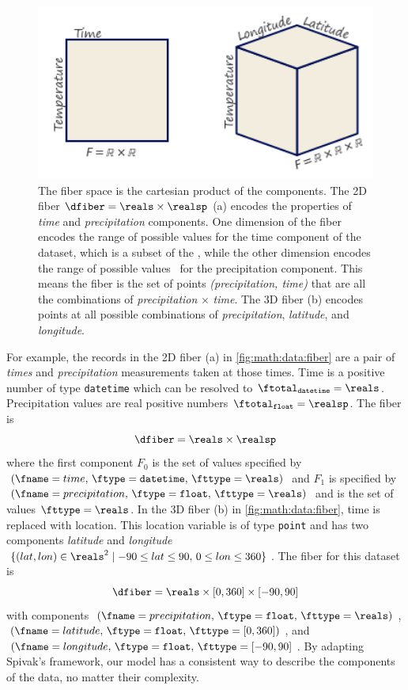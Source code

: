 \documentclass[../main.tex]{subfiles}
\begin{document}
\begin{figure}[H]
    \includegraphics[width=1\textwidth]{figures/math/fiber.png}
    \caption{The fiber space is the cartesian product of the components.  The 2D fiber \(\dfiber=\reals\times\realsp\) (a) encodes the properties of \textit{time} and \textit{precipitation} components.  One dimension of the fiber encodes the range of possible values for the time component of the dataset, which is a subset of the \reals, while the other dimension encodes the range of possible values  \realsp\ for the precipitation component. This means the fiber is the set of points \textit{(precipitation, time)} that are all the combinations of \textit{precipitation} $\times$ \textit{time}. The 3D fiber (b) encodes points at all possible combinations of \textit{precipitation}, \textit{latitude}, and \textit{longitude}.}
    \label{fig:math:data:fiber}
\end{figure}

For example, the records in the 2D fiber (a) in \autoref{fig:math:data:fiber} are a pair of \textit{times} and \textit{precipitation} measurements taken at those times. Time is a positive number of type \texttt{datetime} which can be resolved to $\ftotal_{\texttt{datetime}}= \reals$. Precipitation values are real positive numbers $\ftotal_{\texttt{float}} = \realsp$. The fiber is 
\begin{equation*}
    \dfiber =  \reals \times \realsp 
\end{equation*} 
where the first component $F_0$ is the set of values specified by $(\fname=time,\, \ftype=\texttt{datetime},\, \fttype=\reals)$ and $F_1$ is specified by $(\fname=precipitation,\, \ftype=\texttt{float},\, \fttype=\reals)$ and is the set of values $\fttype=\reals$. In the 3D fiber (b) in \autoref{fig:math:data:fiber}, time is replaced with location. This location variable is of type \texttt{point} and has two components \textit{latitude} and \textit{longitude} $\{(lat,lon) \in \reals^{2} \mid  -90\leq lat \leq 90,\, 0 \leq lon \leq 360\}$. The fiber for this dataset is
\begin{equation*}
    \dfiber = \reals \times \left[0, 360\right] \times \left[-90, 90\right]
\end{equation*} 
with components \((\fname=precipitation,\, \ftype=\texttt{float},\, \fttype=\reals)\), \((\fname=latitude,\, \ftype=\texttt{float}, \, \fttype=\left[0, 360\right])\), and \((\fname=longitude,\, \ftype=\texttt{float},\,\fttype= \left[-90, 90\right]\). By adapting Spivak's framework, our model has a consistent way to describe the components of the data, no matter their complexity. 
\end{document}
